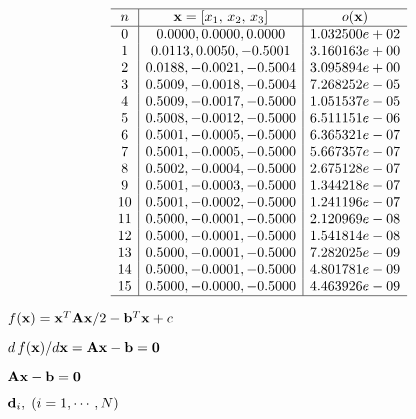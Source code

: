 \documentclass{article}
\def\lthtmlcheckvsize{\ifdim\ht\sizebox<\vsize 
  \ifdim\wd\sizebox<\hsize\expandafter\hfill\fi \expandafter\vfill
  \else\expandafter\vss\fi}%
\begin{document}
{\newpage\clearpage
{}%
\begin{displaymath}\begin{array}{c|c|c}\hline
n & {\bf x}=[x_1,\,x_2,\,x_3] & o({\bf x}) \\\hline
0 &	0.0000,  0.0000,  0.0000 &	1.032500e+02 \\
1 &	0.0113,  0.0050, -0.5001 &	3.160163e+00 \\
2 &	0.0188, -0.0021, -0.5004 &	3.095894e+00 \\
3 &	0.5009, -0.0018, -0.5004 &	7.268252e-05 \\
4 &	0.5009, -0.0017, -0.5000 &	1.051537e-05 \\
5 &	0.5008, -0.0012, -0.5000 &	6.511151e-06 \\
6 &	0.5001, -0.0005, -0.5000 &	6.365321e-07 \\
7 &	0.5001, -0.0005, -0.5000 &	5.667357e-07 \\
8 &	0.5002, -0.0004, -0.5000 &	2.675128e-07 \\
9 &	0.5001, -0.0003, -0.5000 &	1.344218e-07 \\
10&	0.5001, -0.0002, -0.5000 &	1.241196e-07 \\
11&	0.5000, -0.0001, -0.5000 &	2.120969e-08 \\
12&	0.5000, -0.0001, -0.5000 &	1.541814e-08 \\
13&	0.5000, -0.0001, -0.5000 &	7.282025e-09 \\
14&	0.5000, -0.0001, -0.5000 &	4.801781e-09 \\
15&	0.5000, -0.0000, -0.5000 &	4.463926e-09 \\\hline
\end{array}\end{displaymath}%
\lthtmldisplayZ
\lthtmlcheckvsize\clearpage}

{\newpage\clearpage
{}%
$ f({\bf x})={\bf x}^T{\bf A}{\bf x}/2-{\bf b}^T{\bf x}+c$%
\lthtmlindisplaymathZ
\lthtmlcheckvsize\clearpage}

{\newpage\clearpage
{}%
$ d\,f({\bf x})/d{\bf x}={\bf A}{\bf x}-{\bf b}={\bf0}$%
\lthtmlindisplaymathZ
\lthtmlcheckvsize\clearpage}

{\newpage\clearpage
{}%
$ {\bf A}{\bf x}-{\bf b}={\bf0}$%
\lthtmlindisplaymathZ
\lthtmlcheckvsize\clearpage}

{\newpage\clearpage
{}%
$ {\bf d}_i,\;(i=1,\cdots,N)$%
\lthtmlindisplaymathZ
\lthtmlcheckvsize\clearpage}
\end{document}
